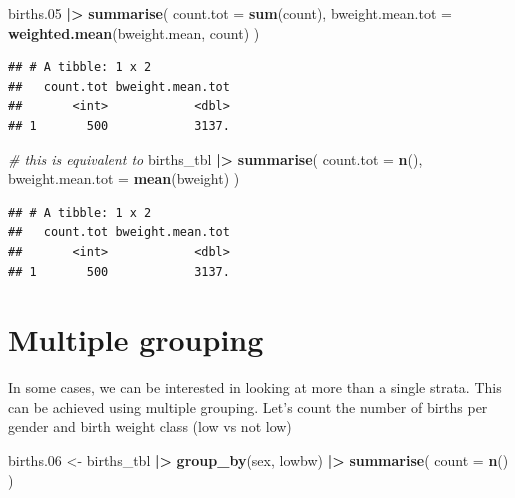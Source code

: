 \documentclass[
]{book}
\newenvironment{Shaded}{\begin{snugshade}}{\end{snugshade}}
\newcommand{\AttributeTok}[1]{\textcolor[rgb]{0.13,0.29,0.53}{#1}}
\newcommand{\CommentTok}[1]{\textcolor[rgb]{0.56,0.35,0.01}{\textit{#1}}}
\newcommand{\FloatTok}[1]{\textcolor[rgb]{0.00,0.00,0.81}{#1}}
\newcommand{\FunctionTok}[1]{\textcolor[rgb]{0.13,0.29,0.53}{\textbf{#1}}}
\newcommand{\NormalTok}[1]{#1}
\newcommand{\OtherTok}[1]{\textcolor[rgb]{0.56,0.35,0.01}{#1}}
\newcommand{\SpecialCharTok}[1]{\textcolor[rgb]{0.81,0.36,0.00}{\textbf{#1}}}
\begin{document}
\begin{Shaded}
\begin{Highlighting}[]
\NormalTok{births}\FloatTok{.05} \SpecialCharTok{|\textgreater{}}
  \FunctionTok{summarise}\NormalTok{(}
    \AttributeTok{count.tot =} \FunctionTok{sum}\NormalTok{(count),}
    \AttributeTok{bweight.mean.tot =} \FunctionTok{weighted.mean}\NormalTok{(bweight.mean, count)}
\NormalTok{  )}
\end{Highlighting}
\end{Shaded}

\begin{verbatim}
## # A tibble: 1 x 2
##   count.tot bweight.mean.tot
##       <int>            <dbl>
## 1       500            3137.
\end{verbatim}

\begin{Shaded}
\begin{Highlighting}[]
\CommentTok{\# this is equivalent to}
\NormalTok{births\_tbl }\SpecialCharTok{|\textgreater{}}
  \FunctionTok{summarise}\NormalTok{(}
    \AttributeTok{count.tot =} \FunctionTok{n}\NormalTok{(),}
    \AttributeTok{bweight.mean.tot =} \FunctionTok{mean}\NormalTok{(bweight)}
\NormalTok{  )}
\end{Highlighting}
\end{Shaded}

\begin{verbatim}
## # A tibble: 1 x 2
##   count.tot bweight.mean.tot
##       <int>            <dbl>
## 1       500            3137.
\end{verbatim}

\section{Multiple grouping}\label{multiple-grouping}

In some cases, we can be interested in looking at more than a single strata. This can be achieved using multiple grouping.
Let's count the number of births per gender and birth weight class (low vs not low)

\begin{Shaded}
\begin{Highlighting}[]
\NormalTok{births}\FloatTok{.06} \OtherTok{\textless{}{-}}
\NormalTok{  births\_tbl }\SpecialCharTok{|\textgreater{}}
  \FunctionTok{group\_by}\NormalTok{(sex, lowbw) }\SpecialCharTok{|\textgreater{}}
  \FunctionTok{summarise}\NormalTok{(}
    \AttributeTok{count =} \FunctionTok{n}\NormalTok{()}
\NormalTok{  )}
\end{Highlighting}
\end{Shaded}
\end{document}
